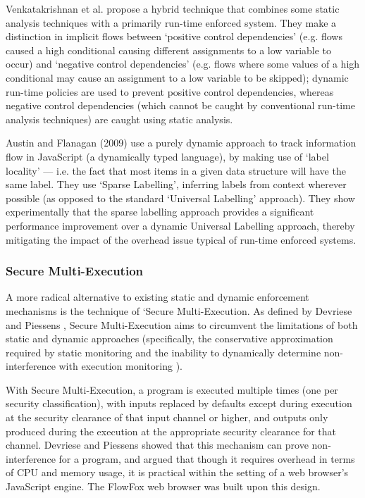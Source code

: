 Venkatakrishnan et al. \cite{venkatakrishnan2006runtime} propose a hybrid technique that combines some static analysis techniques with a primarily run-time enforced system. They make a distinction in implicit flows between `positive control dependencies' (e.g. flows caused a high conditional causing different assignments to a low variable to occur) and `negative control dependencies' (e.g. flows where some values of a high conditional may cause an assignment to a low variable to be skipped); dynamic run-time policies are used to prevent positive control dependencies, whereas negative control dependencies (which cannot be caught by conventional run-time analysis techniques) are caught using static analysis.

Austin and Flanagan (2009) \cite{austin2009dynamicif} use a purely dynamic approach to track information flow in JavaScript (a dynamically typed language), by making use of `label locality' --- i.e. the fact that most items in a given data structure will have the same label. They use `Sparse Labelling', inferring labels from context wherever possible (as opposed to the standard `Universal Labelling' approach). They show experimentally that the sparse labelling approach provides a significant performance improvement over a dynamic Universal Labelling approach, thereby mitigating the impact of the overhead issue typical of run-time enforced systems.

\subsubsection{Secure Multi-Execution}

A more radical alternative to existing static and dynamic enforcement mechanisms is the technique of `Secure Multi-Execution. As defined by Devriese and Piessens \cite{devriese2010sme}, Secure Multi-Execution aims to circumvent the limitations of both static and dynamic approaches (specifically, the conservative approximation required by static monitoring and the inability to dynamically determine non-interference with execution monitoring \cite{schneider2000executionmonitoring}).

With Secure Multi-Execution, a program is executed multiple times (one per security classification), with inputs replaced by defaults except during execution at the security clearance of that input channel or higher, and outputs only produced during the execution at the appropriate security clearance for that channel. Devriese and Piessens \cite{devriese2010sme} showed that this mechanism can prove non-interference for a program, and argued that though it requires overhead in terms of CPU and memory usage, it is practical within the setting of a web browser's JavaScript engine. The FlowFox web browser \cite{degroef2012flowfox} was built upon this design.
	